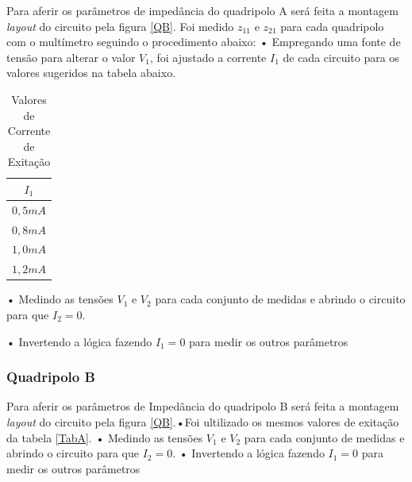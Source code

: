Para aferir os parâmetros de impedância do quadripolo A será feita a montagem \textit{layout} do circuito pela figura \ref{QB}. Foi medido $z_{11}$ e $z_{21}$ para cada quadripolo com o multímetro seguindo o procedimento abaixo:
• Empregando uma fonte de tensão para alterar o valor $V_1$, foi ajustado a corrente $I_1$ de cada circuito para os valores sugeridos na tabela abaixo.
\begin{table}[!htb]
\caption{Valores de Corrente de Exitação}\label{TabA} 
\label{ressimA}
\centering
\begin{tabular}{c}
	$I_1$ \\
	\hline
	$0,5mA$\\
    \hline
    $0,8mA$\\
    \hline
    $1,0mA$\\
	\hline
    $1,2mA$\\
    \hline
    
	\end{tabular}
\end{table}

• Medindo as tensões $V_1$ e $V_2$ para cada conjunto de medidas   e abrindo o circuito para que $I_2 = 0$.\newline

• Invertendo a lógica fazendo $I_1 = 0$ para medir os outros parâmetros

 
 \subsubsection{Quadripolo B}
Para aferir os parâmetros de Impedância do quadripolo B será feita a montagem \textit{layout} do circuito pela figura \ref{QB}.\newline•Foi ultilizado os mesmos valores de exitação da tabela \ref{TabA}.\newline
    • Medindo as tensões $V_1$ e $V_2$ para cada conjunto de medidas   e abrindo o circuito para que $I_2 = 0$.\newline
    • Invertendo a lógica fazendo $I_1 = 0$ para medir os outros parâmetros
